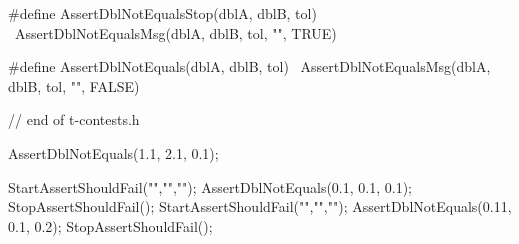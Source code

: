 #define AssertDblNotEqualsStop(dblA, dblB, tol) \
  AssertDblNotEqualsMsg(dblA, dblB, tol, "", TRUE)

#define AssertDblNotEquals(dblA, dblB, tol)    \
  AssertDblNotEqualsMsg(dblA, dblB, tol, "", FALSE)

// end of t-contests.h
\stopCHeader

\startCTest
AssertDblNotEquals(1.1, 2.1, 0.1);
\stopCTest
\stopTestCase

\startCTest
StartAssertShouldFail("","","");
  AssertDblNotEquals(0.1, 0.1, 0.1);
StopAssertShouldFail();
StartAssertShouldFail("","","");
  AssertDblNotEquals(0.11, 0.1, 0.2);
StopAssertShouldFail();
\stopCTest
\stopTestCase

\stopTestSuite
